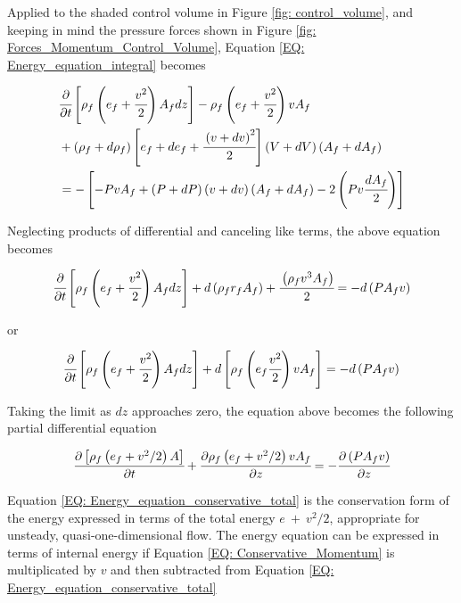 \documentclass[../Article_Sensitivity_Analsysis.tex]{subfiles}
\begin{document}
	Applied to the shaded control volume in Figure \ref{fig: control_volume}, and keeping in mind the pressure forces shown in Figure \ref{fig: Forces_Momentum_Control_Volume}, Equation \ref{EQ: Energy_equation_integral} becomes
	
	{\footnotesize
		\begin{align}
			&\cfrac{\partial}{\partial t} \left[ \rho_f \left( e_f + \cfrac{v^2}{2} \right) A_f dz \right] - \rho_f \left( e_f + \cfrac{v^2}{2} \right) v A_f \nonumber \\
			&+ \left( \rho_f + d\rho_f \right) \left[ e_f + de_f + \cfrac{\left( v + dv \right)^2}{2} \right] \left( V+dV \right) \left( A_f+dA_f \right) \nonumber \\
			&= - \left[ -PvA_f + \left(P+dP\right) \left(v+dv\right) \left(A_f+dA_f\right) - 2\left( Pv\cfrac{dA_f}{2} \right) \right]
		\end{align}
	} %
	
	Neglecting products of differential and canceling like terms, the above equation becomes
	
	{\footnotesize
		\begin{equation}
			\cfrac{\partial}{\partial t} \left[ \rho_f \left( e_f + \cfrac{v^2}{2} \right) A_f dz \right] + d\left( \rho_f r_f A_f \right) + \cfrac{ \left( \rho_f v^3 A_f \right) }{2} = -d \left( P A_f v \right)
		\end{equation}
	}

	or
	
	{\footnotesize
		\begin{equation}
			\cfrac{\partial}{\partial t} \left[ \rho_f \left( e_f + \cfrac{v^2}{2} \right) A_f dz \right] + d \left[ \rho_f \left( e_f \cfrac{v^2}{2} \right) vA_f \right] = - d\left( P A_f v \right)
		\end{equation}
	}

	Taking the limit as $dz$ approaches zero, the equation above becomes the following partial differential equation
	
	{\footnotesize
		\begin{equation}
			\cfrac{\partial \left[ \rho_f \left( e_f + v^2 / 2 \right) A \right]}{\partial t} + \cfrac{\partial \rho_f \left( e_f + v^2 / 2 \right)vA_f}{\partial z} = -\cfrac{\partial \left( P A_f v \right)}{\partial z}
			\label{EQ: Energy_equation_conservative_total}
		\end{equation}
	}
	
	Equation \ref{EQ: Energy_equation_conservative_total} is the conservation form of the energy expressed in terms of the total energy $e~+~v^2/2$, appropriate for unsteady, quasi-one-dimensional flow. The energy equation can be expressed in terms of internal energy if Equation \ref{EQ: Conservative_Momentum} is multiplicated by $v$ and then subtracted from Equation \ref{EQ: Energy_equation_conservative_total}
	
\end{document}
